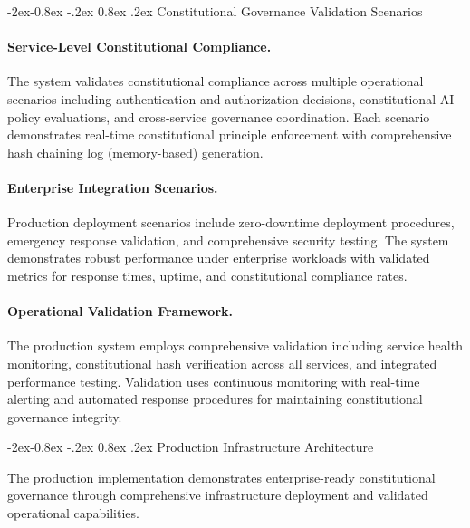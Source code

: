 \documentclass[manuscript,screen,9pt]{acmart}
\makeatletter
\renewcommand\subsubsection{\@startsection{subsubsection}{3}{\z@}%
  {-2ex\@plus -0.8ex \@minus -.2ex}%
  {0.8ex \@plus .2ex}%
  {\normalfont\normalsize\bfseries}}
\makeatother
\begin{document}
\subsubsection{Constitutional Governance Validation Scenarios}
\label{subsubsec:governance_scenarios}

\paragraph{Service-Level Constitutional Compliance.} The system validates constitutional compliance across multiple operational scenarios including authentication and authorization decisions, constitutional AI policy evaluations, and cross-service governance coordination. Each scenario demonstrates real-time constitutional principle enforcement with comprehensive hash chaining log (memory-based) generation.

\paragraph{Enterprise Integration Scenarios.} Production deployment scenarios include zero-downtime deployment procedures, emergency response validation, and comprehensive security testing. The system demonstrates robust performance under enterprise workloads with validated metrics for response times, uptime, and constitutional compliance rates.

\paragraph{Operational Validation Framework.} The production system employs comprehensive validation including service health monitoring, constitutional hash verification across all services, and integrated performance testing. Validation uses continuous monitoring with real-time alerting and automated response procedures for maintaining constitutional governance integrity.

\subsubsection{Production Infrastructure Architecture}
\label{subsubsec:production_infrastructure}

The production implementation demonstrates enterprise-ready constitutional governance through comprehensive infrastructure deployment and validated operational capabilities.
\end{document}
